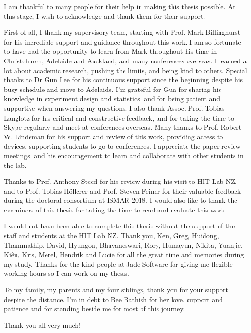 
\begin{acknowledgements}
\addchaptertocentry{\acknowledgementname} %

I am thankful to many people for their help in making this thesis possible. At this stage, I wish to acknowledge and thank them for their support. 

First of all, I thank my supervisory team, starting with Prof. Mark Billinghurst for his incredible support and guidance throughout this work. I am so fortunate to have had the opportunity to learn from Mark throughout his time in Christchurch, Adelaide and Auckland, and many conferences overseas. I learned a lot about academic research, pushing the limits, and being kind to others. 
Special thanks to Dr Gun Lee for his continuous support since the beginning despite his busy schedule and move to Adelaide. I'm grateful for Gun for sharing his knowledge in experiment design and statistics, and for being patient and supportive when answering my questions. 
I also thank Assoc. Prof. Tobias Langlotz for his critical and constructive feedback, and for taking the time to Skype regularly and meet at conferences overseas.
Many thanks to Prof. Robert W. Lindeman for his support and review of this work, providing access to devices, supporting students to go to conferences. I appreciate the paper-review meetings, and his encouragement to learn and collaborate with other students in the lab. 

Thanks to Prof. Anthony Steed for his review during his visit to HIT Lab NZ, and to Prof. Tobias Höllerer and Prof. Steven Feiner for their valuable feedback during the doctoral consortium at ISMAR 2018. I would also like to thank the examiners of this thesis for taking the time to read and evaluate this work. 

I would not have been able to complete this thesis without the support of the staff and students at the HIT Lab NZ. Thank you, Ken, Greg, Huidong, Thammathip, David, Hyungon, Bhuvaneswari, Rory, Humayun, Nikita, Yuanjie, Kiên, Kris, Merel, Hendrik and Lucie for all the great time and memories during my study. Thanks for the kind people at Jade Software for giving me flexible working hours so I can work on my thesis.

To my family, my parents and my four siblings, thank you for your support despite the distance. I'm in debt to Bee Bathish for her love, support and patience and for standing beside me for most of this journey. 

Thank you all very much!

\end{acknowledgements}